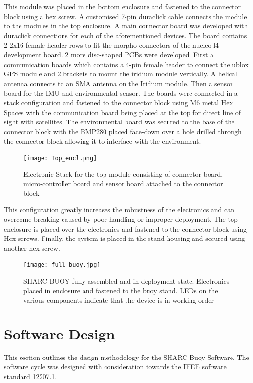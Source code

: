 This module was placed in the bottom enclosure and fastened to the connector block using a hex screw. A customised 7-pin duraclick cable connects the module to the modules in the top enclosure. A main connector board was developed with duraclick connections for each of the aforementioned devices. The board contains 2  2x16 female header rows to fit the morpho connectors of the nucleo-l4 development board. 2 more disc-shaped PCBs were developed. First a communication boards which contains a 4-pin female header to connect the ublox GPS module and 2 brackets to mount the iridium module vertically. A helical antenna connects to an SMA antenna on the Iridium module. Then a sensor board for the IMU and environmental sensor. The boards were connected in a stack configuration and fastened to the connector block using M6 metal Hex Spaces with the communication board being placed at the top for direct line of sight with satellites. The environmental board was secured to the base of the connector block with the BMP280 placed face-down over a hole drilled through the connector block allowing it to interface with the environment.
 \begin{figure}[H]
     \centering
     \texttt{[image: Top\_encl.png]}
     \caption{Electronic Stack for the top module consisting of connector board, micro-controller board and sensor board attached to the connector block }
     \label{fig:top_elec}
 \end{figure}

This configuration greatly increases the robustness of the electronics and can overcome breaking caused by poor handling or improper deployment.  The top enclosure is placed over the electronics and fastened to the connector block using Hex screws. Finally, the system is placed in the stand housing and secured using another hex screw.

\begin{figure}[H]
    \centering
    \texttt{[image: full buoy.jpg]}
    \caption{SHARC BUOY fully assembled and in deployment state. Electronics placed in enclosure and fastened to the buoy stand. LEDs on the various components indicate that the device is in working order}
    \label{fig:my_label}
\end{figure}

\chapter{Software Design}
\label{sec:ch3_soft}
This section outlines the design methodology for the SHARC Buoy Software. The software cycle was designed with consideration towards the IEEE software standard 12207.1.


